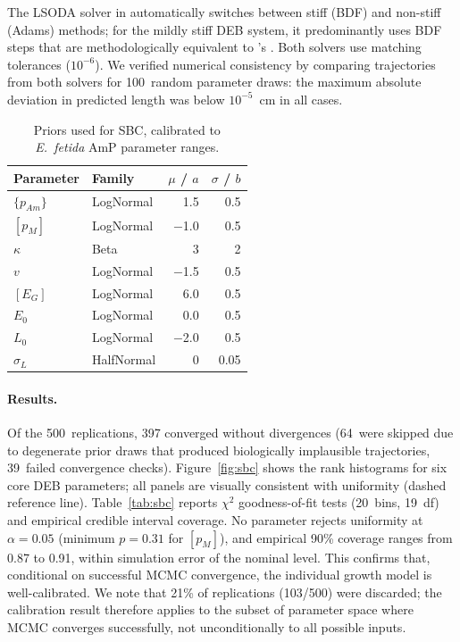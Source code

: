 \documentclass[article,shortnames]{jss}
\newcommand{\pAm}{\{p_{Am}\}}
\newcommand{\pM}{[p_M]}
\newcommand{\EG}{[E_G]}
\begin{document}
\noindent
The LSODA solver in  automatically switches between
stiff (BDF) and non-stiff (Adams) methods; for the mildly stiff
DEB system, it predominantly uses BDF steps that are
methodologically equivalent to 's
.  Both solvers use matching tolerances
($10^{-6}$).  We verified numerical consistency by comparing
trajectories from both solvers for 100~random parameter draws:
the maximum absolute deviation in predicted length was below
$10^{-5}$~cm in all cases.

\begin{table}[t!]
\centering
\caption{Priors used for SBC, calibrated to \emph{E.~fetida}
  AmP parameter ranges.}
\label{tab:sbc_priors}
\begin{tabular}{llrr}
\toprule
Parameter & Family & $\mu$ / $a$ & $\sigma$ / $b$ \\
\midrule
$\pAm$     & LogNormal  & 1.5    & 0.5  \\
$\pM$      & LogNormal  & $-$1.0 & 0.5  \\
$\kappa$   & Beta       & 3      & 2    \\
$v$        & LogNormal  & $-$1.5 & 0.5  \\
$\EG$      & LogNormal  & 6.0    & 0.5  \\
$E_0$      & LogNormal  & 0.0    & 0.5  \\
$L_0$      & LogNormal  & $-$2.0 & 0.5  \\
$\sigma_L$ & HalfNormal & 0      & 0.05 \\
\bottomrule
\end{tabular}
\end{table}

\paragraph{Results.}
Of the 500~replications, 397 converged without divergences
(64~were skipped due to degenerate prior draws that produced
biologically implausible trajectories, 39~failed convergence
checks).  Figure~\ref{fig:sbc} shows the rank histograms
for six core DEB parameters; all panels are visually consistent with
uniformity (dashed reference line).  Table~\ref{tab:sbc} reports
$\chi^2$ goodness-of-fit tests (20~bins, 19~df) and empirical
credible interval coverage.  No parameter rejects uniformity at
$\alpha = 0.05$ (minimum $p = 0.31$ for $\pM$), and empirical
90\% coverage ranges from 0.87 to 0.91, within simulation error
of the nominal level.  This confirms that, conditional on
successful MCMC convergence, the  individual
growth model is well-calibrated.  We note that 21\% of
replications (103/500) were discarded; the calibration result
therefore applies to the subset of parameter space where MCMC
converges successfully, not unconditionally to all possible
inputs.
\end{document}
